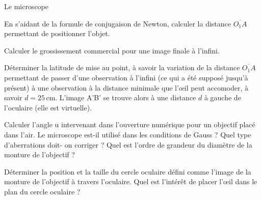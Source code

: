 \begin{exo}[MPSI]{Le microscope}
\begin{quest}


\item En s'aidant de la formule de conjugaison de Newton, calculer la distance $\overline{O_1A}$ permettant de positionner l’objet.


\item Calculer le grossissement commercial pour une image finale à l’infini.
\sol{
}
\item Déterminer la latitude de mise au point, à savoir la variation de la distance $\overline{O_1A}$ permettant de passer d'une observation à l'infini (ce qui a été supposé jusqu'à présent) à une observation à la distance minimale que l'œil peut accomoder, à savoir $d=25\,$cm. L'image A'B' se trouve alors à une distance $d$ à gauche de l'oculaire (elle est virtuelle).

\item Calculer l’angle u intervenant dans l’ouverture numérique pour un objectif placé dans
l’air. Le microscope est-il utilisé dans les conditions de Gauss ? Quel type d’aberrations doit-
on corriger ? Quel est l’ordre de grandeur du diamètre de la monture de l’objectif ?

\item Déterminer la position et la taille du cercle oculaire défini comme l’image de la monture
de l’objectif à travers l’oculaire. Quel est l’intérêt de placer l’œil dans le plan du cercle oculaire ?
\end{quest}
\end{exo}


